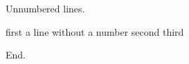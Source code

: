 \documentclass{article}
\begin{document}
Unnumbered lines.

\begin{algorithm}[h]
\caption{Statex}
\begin{algorithmic}[1]
\State first
\Statex a line without a number
\State second
\Statex
\State third
\end{algorithmic}
\end{algorithm}

End.
\end{document}
